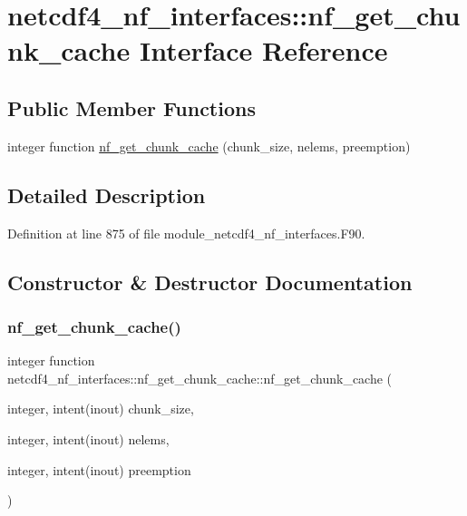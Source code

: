 \hypertarget{interfacenetcdf4__nf__interfaces_1_1nf__get__chunk__cache}{}\section{netcdf4\+\_\+nf\+\_\+interfaces\+:\+:nf\+\_\+get\+\_\+chunk\+\_\+cache Interface Reference}
\label{interfacenetcdf4__nf__interfaces_1_1nf__get__chunk__cache}
\subsection*{Public Member Functions}
\begin{DoxyCompactItemize}
\item 
integer function \hyperlink{interfacenetcdf4__nf__interfaces_1_1nf__get__chunk__cache_af43835b7dafb742b722b191a4b5039ee}{nf\+\_\+get\+\_\+chunk\+\_\+cache} (chunk\+\_\+size, nelems, preemption)
\end{DoxyCompactItemize}


\subsection{Detailed Description}


Definition at line 875 of file module\+\_\+netcdf4\+\_\+nf\+\_\+interfaces.\+F90.



\subsection{Constructor \& Destructor Documentation}
\mbox{\label{interfacenetcdf4__nf__interfaces_1_1nf__get__chunk__cache_af43835b7dafb742b722b191a4b5039ee}} 
\subsubsection{\texorpdfstring{nf\+\_\+get\+\_\+chunk\+\_\+cache()}{nf\_get\_chunk\_cache()}}
{\footnotesize\ttfamily integer function netcdf4\+\_\+nf\+\_\+interfaces\+::nf\+\_\+get\+\_\+chunk\+\_\+cache\+::nf\+\_\+get\+\_\+chunk\+\_\+cache (\begin{DoxyParamCaption}\item[{integer, intent(inout)}]{chunk\+\_\+size,  }\item[{integer, intent(inout)}]{nelems,  }\item[{integer, intent(inout)}]{preemption }\end{DoxyParamCaption})}



